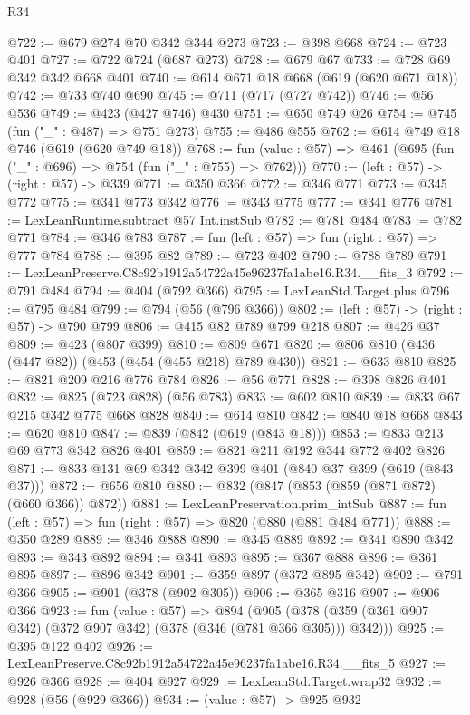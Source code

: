 \begin{lexlean}{R34}
\begin{coremodule}
@722 := @679 @274 @70 @342 @344 @273
@723 := @398 @668
@724 := @723 @401
@727 := @722 @724 (@687 @273)
@728 := @679 @67
@733 := @728 @69 @342 @342 @668 @401
@740 := @614 @671 @18 @668 (@619 (@620 @671 @18))
@742 := @733 @740 @690
@745 := @711 (@717 (@727 @742))
@746 := @56 @536
@749 := @423 (@427 @746) @430
@751 := @650 @749 @26
@754 := @745 (fun ("_" : @487) => @751 @273)
@755 := @486 @555
@762 := @614 @749 @18 @746 (@619 (@620 @749 @18))
@768 := fun (value : @57) => @461 (@695 (fun ("_" : @696) => @754 (fun ("_" : @755) => @762)))
@770 := (left : @57) -> (right : @57) -> @339
@771 := @350 @366
@772 := @346 @771
@773 := @345 @772
@775 := @341 @773 @342
@776 := @343 @775
@777 := @341 @776
@781 := LexLeanRuntime.subtract @57 Int.instSub
@782 := @781 @484
@783 := @782 @771
@784 := @346 @783
@787 := fun (left : @57) => fun (right : @57) => @777 @784
@788 := @395 @82
@789 := @723 @402
@790 := @788 @789
@791 := LexLeanPreserve.C8c92b1912a54722a45e96237fa1abe16.R34.__fits_3
@792 := @791 @484
@794 := @404 (@792 @366)
@795 := LexLeanStd.Target.plus
@796 := @795 @484
@799 := @794 (@56 (@796 @366))
@802 := (left : @57) -> (right : @57) -> @790 @799
@806 := @415 @82 @789 @799 @218
@807 := @426 @37
@809 := @423 (@807 @399)
@810 := @809 @671
@820 := @806 @810 (@436 (@447 @82)) (@453 (@454 (@455 @218) @789 @430))
@821 := @633 @810
@825 := @821 @209 @216 @776 @784
@826 := @56 @771
@828 := @398 @826 @401
@832 := @825 (@723 @828) (@56 @783)
@833 := @602 @810
@839 := @833 @67 @215 @342 @775 @668 @828
@840 := @614 @810
@842 := @840 @18 @668
@843 := @620 @810
@847 := @839 (@842 (@619 (@843 @18)))
@853 := @833 @213 @69 @773 @342 @826 @401
@859 := @821 @211 @192 @344 @772 @402 @826
@871 := @833 @131 @69 @342 @342 @399 @401 (@840 @37 @399 (@619 (@843 @37)))
@872 := @656 @810
@880 := @832 (@847 (@853 (@859 (@871 @872) (@660 @366)) @872))
@881 := LexLeanPreservation.prim_intSub
@887 := fun (left : @57) => fun (right : @57) => @820 (@880 (@881 @484 @771))
@888 := @350 @289
@889 := @346 @888
@890 := @345 @889
@892 := @341 @890 @342
@893 := @343 @892
@894 := @341 @893
@895 := @367 @888
@896 := @361 @895
@897 := @896 @342
@901 := @359 @897 (@372 @895 @342)
@902 := @791 @366
@905 := @901 (@378 (@902 @305))
@906 := @365 @316
@907 := @906 @366
@923 := fun (value : @57) =>
  @894 (@905 (@378 (@359 (@361 @907 @342) (@372 @907 @342) (@378 (@346 (@781 @366 @305))) @342)))
@925 := @395 @122 @402
@926 := LexLeanPreserve.C8c92b1912a54722a45e96237fa1abe16.R34.__fits_5
@927 := @926 @366
@928 := @404 @927
@929 := LexLeanStd.Target.wrap32
@932 := @928 (@56 (@929 @366))
@934 := (value : @57) -> @925 @932

\end{coremodule}
\end{lexlean}
